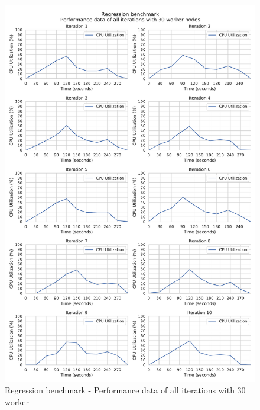 \begin{figure}[h]
\centering
\includegraphics[scale=0.5]{images/appendix/evaluation_data/regression_benchmark/regression_30_worker_cpu_performance}
\caption{Regression benchmark - Performance data of all iterations with 30 worker}
\label{fig:appendix_eval_regression_static30}
\end{figure}

